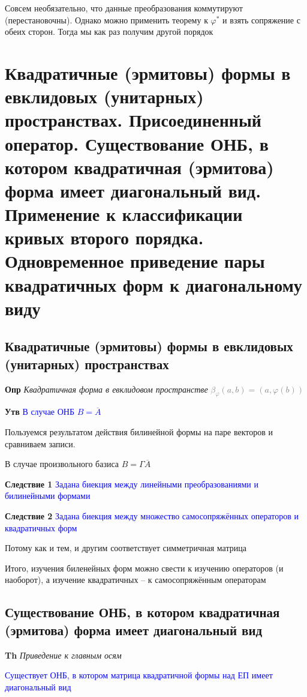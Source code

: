 \documentclass[a4paper, 14pt]{article}
\begin{document}
    Совсем необязательно, что данные преобразования коммутируют (перестановочны).
    Однако можно применить теорему к $\varphi^*$ и взять сопряжение с обеих сторон.
    Тогда мы как раз получим другой порядок

    \section{Квадратичные (эрмитовы) формы в евклидовых (унитарных) пространствах.
    Присоединенный оператор.
    Существование ОНБ, в котором квадратичная (эрмитова) форма имеет диагональный вид.
    Применение к классификации кривых второго порядка.
    Одновременное приведение пары квадратичных форм к диагональному виду}

    \subsection{Квадратичные (эрмитовы) формы в евклидовых (унитарных) пространствах}

    \textbf{Опр} \textit{Квадратичная форма в евклидовом пространстве} \textcolor{gray}{$\beta_\varphi (a, b) = (a, \varphi(b))$}

    \textbf{Утв} \textcolor{blue}{В случае ОНБ $B = \overline{A}$}

    Пользуемся результатом действия билинейной формы на паре векторов и сравниваем записи.

    В случае произвольного базиса $B = \Gamma \overline{A}$

    \textbf{Следствие 1} \textcolor{blue}{Задана биекция между линейными преобразованиями и билинейными формами}

    \textbf{Следствие 2} \textcolor{blue}{Задана биекция между множество самосопряжённых операторов и квадратичных форм}

    Потому как и тем, и другим соответствует симметричная матрица

    Итого, изучения биленейных форм можно свести к изучению операторов (и наоборот), а изучение квадратичных -- к
    самосопряжённым операторам

    \subsection{Существование ОНБ, в котором квадратичная (эрмитова) форма имеет диагональный вид}

    \textbf{Th} \textit{Приведение к главным осям}

    \textcolor{blue}{Существует ОНБ, в котором матрица квадратичной формы над ЕП имеет диагональный вид}
\end{document}
